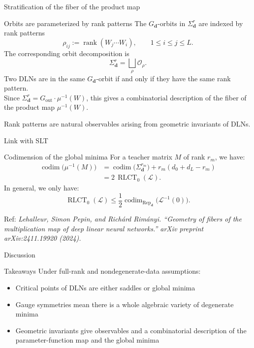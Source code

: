 \documentclass[aspectratio=169,11pt]{beamer}
\begin{document}
\begin{frame}{Stratification of the fiber of the product map}
\begin{block}{Orbits are parameterized by rank patterns}
The $G_{\mathbf{d}}$-orbits in $\Sigma_{\mathbf{d}}^r$ are indexed by rank patterns
\[
\rho_{ij}:=\operatorname{rank}(W_j\cdots W_i),
\qquad
1\leq i\leq j\leq L.
\]
The corresponding orbit decomposition is
\[
\Sigma_{\mathbf{d}}^r = \bigsqcup_{\rho} \mathcal{O}_{\rho}.
\]
Two DLNs are in the same $G_{\mathbf{d}}$-orbit if and only if they have the same rank pattern.
\\
Since $\Sigma_{\mathbf{d}}^{r} = G_{\mathrm{out}}\cdot\mu^{-1}(W)$, this gives a combinatorial description of the fiber of the product map $\mu^{-1}(W)$.
\end{block}
Rank patterns are natural observables arising from geometric invariants of DLNs.
\end{frame}
\begin{frame}{Link with SLT}
\begin{block}{Codimension of the global minima}
For a teacher matrix $M$ of rank $r_m$, we have:
    \[
    \begin{aligned}
    \operatorname{codim}\bigl(\mu^{-1}(M)\bigr)
    &=
    \operatorname{codim}\bigl(\Sigma_{\mathbf{d}}^{r_m}\bigr)
    + r_m(d_0 + d_L - r_m) \\
    &= 2\,\operatorname{RLCT}_{0}(\mathcal{L}).
    \end{aligned}
    \]
In general, we only have:
\[
\operatorname{RLCT}_{0}(\mathcal{L})
\leq
\frac{1}{2}\operatorname{codim}_{\operatorname{Rep}_{\mathbf{d}}}\bigl(\mathcal{L}^{-1}(0)\bigr).
\]
\end{block}
Ref: \textit{Lehalleur, Simon Pepin, and Richárd Rimányi. ``Geometry of fibers of the multiplication map of deep linear neural networks.'' arXiv preprint arXiv:2411.19920 (2024).}
\end{frame}
\begin{frame}{Discussion}
\begin{block}{Takeaways}
Under full-rank and nondegenerate-data assumptions:
    \begin{itemize}
        \item Critical points of DLNs are either saddles or global minima
        \item Gauge symmetries mean there is a whole algebraic variety of degenerate minima
        \item Geometric invariants give observables and a combinatorial description of the parameter-function map and the global minima
    \end{itemize}
\end{block}
\end{frame}
\end{document}
